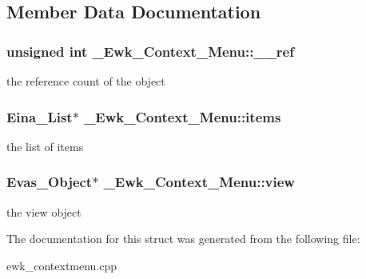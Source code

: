 \subsection{Member Data Documentation}
\hypertarget{struct__Ewk__Context__Menu_a766fe6773baf64c6a7e5b92ff901b371}{
\subsubsection[{\+\_\+\+\_\+ref}]{\setlength{\rightskip}{0pt plus 5cm}unsigned int \+\_\+\+Ewk\+\_\+\+Context\+\_\+\+Menu\+::\+\_\+\+\_\+ref}}\label{struct__Ewk__Context__Menu_a766fe6773baf64c6a7e5b92ff901b371}
the reference count of the object \hypertarget{struct__Ewk__Context__Menu_aae4c9fbd5dadc434932e61ba1871f84d}{
\subsubsection[{items}]{\setlength{\rightskip}{0pt plus 5cm}Eina\+\_\+\+List$\ast$ \+\_\+\+Ewk\+\_\+\+Context\+\_\+\+Menu\+::items}}\label{struct__Ewk__Context__Menu_aae4c9fbd5dadc434932e61ba1871f84d}
the list of items \hypertarget{struct__Ewk__Context__Menu_a07207ff4f163f0061a1018bb4b185490}{
\subsubsection[{view}]{\setlength{\rightskip}{0pt plus 5cm}Evas\+\_\+\+Object$\ast$ \+\_\+\+Ewk\+\_\+\+Context\+\_\+\+Menu\+::view}}\label{struct__Ewk__Context__Menu_a07207ff4f163f0061a1018bb4b185490}
the view object 

The documentation for this struct was generated from the following file\+:\begin{DoxyCompactItemize}
\item 
ewk\+\_\+contextmenu.\+cpp\end{DoxyCompactItemize}
